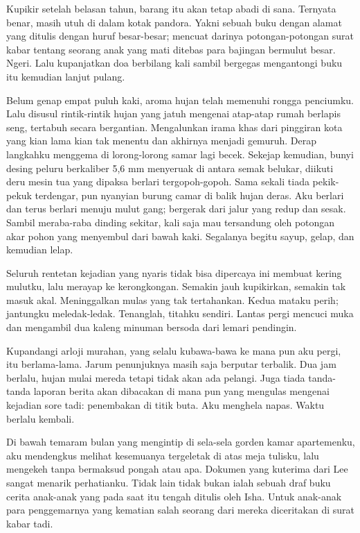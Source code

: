 \documentclass[smalldemyvopaper,11pt,twoside,onecolumn,openright,extrafontsizes]{memoir}
\begin{document}
Kupikir setelah belasan tahun, barang itu akan tetap abadi di sana. Ternyata benar, masih utuh di dalam kotak pandora. Yakni sebuah buku dengan alamat yang ditulis dengan huruf besar-besar; mencuat darinya potongan-potongan surat kabar tentang seorang anak yang mati ditebas para bajingan bermulut besar. Ngeri. Lalu kupanjatkan doa berbilang kali sambil bergegas mengantongi buku itu kemudian lanjut pulang.


Belum genap empat puluh kaki, aroma hujan telah memenuhi rongga penciumku. Lalu disusul rintik-rintik hujan yang jatuh mengenai atap-atap rumah berlapis seng, tertabuh secara bergantian. Mengalunkan irama khas dari pinggiran kota yang kian lama kian tak menentu dan akhirnya menjadi gemuruh. Derap langkahku menggema di lorong-lorong samar lagi becek. Sekejap kemudian, bunyi desing peluru berkaliber 5,6 mm menyeruak di antara semak belukar, diikuti deru mesin tua yang dipaksa berlari tergopoh-gopoh. Sama sekali tiada pekik-pekuk terdengar, pun nyanyian burung camar di balik hujan deras. Aku berlari dan terus berlari menuju mulut gang; bergerak dari jalur yang redup dan sesak. Sambil meraba-raba dinding sekitar, kali saja mau tersandung oleh potongan akar pohon yang menyembul dari bawah kaki. Segalanya begitu sayup, gelap, dan kemudian lelap.


Seluruh rentetan kejadian yang nyaris tidak bisa dipercaya ini membuat kering mulutku, lalu merayap ke kerongkongan. Semakin jauh kupikirkan, semakin tak masuk akal. Meninggalkan mulas yang tak tertahankan. Kedua mataku perih; jantungku meledak-ledak. Tenanglah, titahku sendiri. Lantas pergi mencuci muka dan mengambil dua kaleng minuman bersoda dari lemari pendingin.


Kupandangi arloji murahan, yang selalu kubawa-bawa ke mana pun aku pergi, itu berlama-lama. Jarum penunjuknya masih saja berputar terbalik. Dua jam berlalu, hujan mulai mereda tetapi tidak akan ada pelangi. Juga tiada tanda-tanda laporan berita akan dibacakan di mana pun yang mengulas mengenai kejadian sore tadi: penembakan di titik buta. Aku menghela napas. Waktu berlalu kembali.


Di bawah temaram bulan yang mengintip di sela-sela gorden kamar apartemenku, aku mendengkus melihat kesemuanya tergeletak di atas meja tulisku, lalu mengekeh tanpa bermaksud pongah atau apa. Dokumen yang kuterima dari Lee sangat menarik perhatianku. Tidak lain tidak bukan ialah sebuah draf buku cerita anak-anak yang pada saat itu tengah ditulis oleh Isha. Untuk anak-anak para penggemarnya yang kematian salah seorang dari mereka diceritakan di surat kabar tadi.
\end{document}

